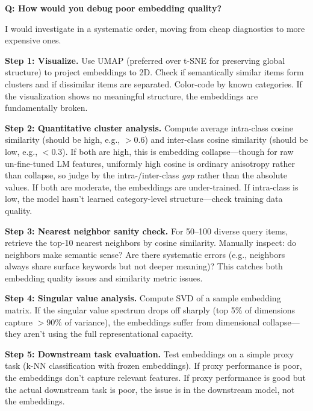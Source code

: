 
\begin{interviewq}
\textbf{Q: How would you debug poor embedding quality?}

 \quad {} \quad \badgefreq{\freqhigh}

\stronganswer

I would investigate in a systematic order, moving from cheap diagnostics to more expensive ones.

\textbf{Step 1: Visualize.} Use UMAP (preferred over t-SNE for preserving global structure) to project embeddings to 2D. Check if semantically similar items form clusters and if dissimilar items are separated. Color-code by known categories. If the visualization shows no meaningful structure, the embeddings are fundamentally broken.

\textbf{Step 2: Quantitative cluster analysis.} Compute average intra-class cosine similarity (should be high, e.g., $>0.6$) and inter-class cosine similarity (should be low, e.g., $<0.3$). If both are high, this is embedding collapse---though for raw un-fine-tuned LM features, uniformly high cosine is ordinary anisotropy rather than collapse, so judge by the intra-/inter-class \textit{gap} rather than the absolute values. If both are moderate, the embeddings are under-trained. If intra-class is low, the model hasn't learned category-level structure---check training data quality.

\textbf{Step 3: Nearest neighbor sanity check.} For 50--100 diverse query items, retrieve the top-10 nearest neighbors by cosine similarity. Manually inspect: do neighbors make semantic sense? Are there systematic errors (e.g., neighbors always share surface keywords but not deeper meaning)? This catches both embedding quality issues and similarity metric issues.

\textbf{Step 4: Singular value analysis.} Compute SVD of a sample embedding matrix. If the singular value spectrum drops off sharply (top 5\% of dimensions capture $>90\%$ of variance), the embeddings suffer from dimensional collapse---they aren't using the full representational capacity.

\textbf{Step 5: Downstream task evaluation.} Test embeddings on a simple proxy task (k-NN classification with frozen embeddings). If proxy performance is poor, the embeddings don't capture relevant features. If proxy performance is good but the actual downstream task is poor, the issue is in the downstream model, not the embeddings.


\end{interviewq}
